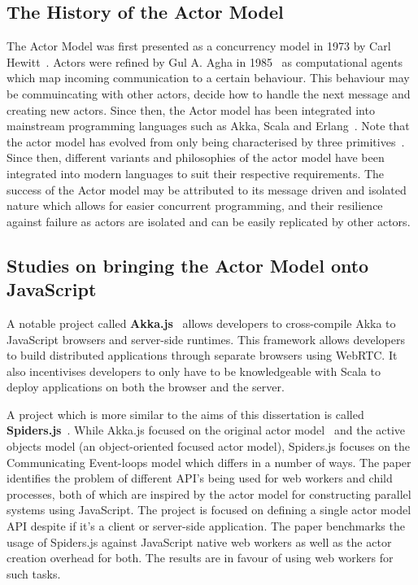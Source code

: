 \documentclass[12pt]{article}
\begin{document}
\subsection{The History of the Actor Model}
The Actor Model was first presented as a concurrency model in 1973 by Carl Hewitt~\cite{hewitt1973session}. Actors were refined by Gul A. Agha in 1985~\cite{agha1985actors} as computational agents which map incoming communication to a certain behaviour. This behaviour may be commuincating with other actors, decide how to handle the next message and creating new actors. Since then, the Actor model has been integrated into mainstream programming languages such as Akka, Scala and Erlang~\cite{43years}\cite{haller2012integration}. Note that the actor model has evolved from only being characterised by three primitives~\cite{agha1985actors}. Since then, different variants and philosophies of the actor model have been integrated into modern languages to suit their respective requirements. The success of the Actor model may be attributed to its message driven and isolated nature which allows for easier concurrent programming, and their resilience against failure as actors are isolated and can be easily replicated by other actors\cite{reactivemanifesto}.
\subsection{Studies on bringing the Actor Model onto JavaScript}
A notable project called \textbf{Akka.js}~\cite{stivan2015akka} allows developers to cross-compile Akka to JavaScript browsers and server-side runtimes. This framework allows developers to build distributed applications through separate browsers using WebRTC. It also incentivises developers to only have to be knowledgeable with Scala to deploy applications on both the browser and the server.

A project which is more similar to the aims of this dissertation is called \textbf{Spiders.js}~\cite{spidersjs}. While Akka.js focused on the original actor model~\cite{agha1985actors} and the active objects model (an object-oriented focused actor model), Spiders.js focuses on the Communicating Event-loops model which differs in a number of ways. The paper identifies the problem of different API's being used for web workers and child processes, both of which are inspired by the actor model for constructing parallel systems using JavaScript. The project is focused on defining a single actor model API despite if it's a client or server-side application. The paper benchmarks the usage of Spiders.js against JavaScript native web workers as well as the actor creation overhead for both. The results are in favour of using web workers for such tasks.
\end{document}
